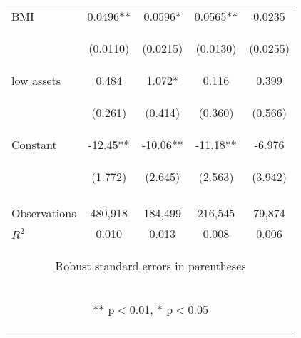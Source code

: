 \documentclass[]{article}
\begin{document}
\begin{center}
\begin{tabular}{lcccc}
BMI & 0.0496** & 0.0596* & 0.0565** & 0.0235 \\
\vspace{4pt} & \begin{footnotesize}(0.0110)\end{footnotesize} & \begin{footnotesize}(0.0215)\end{footnotesize} & \begin{footnotesize}(0.0130)\end{footnotesize} & \begin{footnotesize}(0.0255)\end{footnotesize} \\
low assets & 0.484 & 1.072* & 0.116 & 0.399 \\
\vspace{4pt} & \begin{footnotesize}(0.261)\end{footnotesize} & \begin{footnotesize}(0.414)\end{footnotesize} & \begin{footnotesize}(0.360)\end{footnotesize} & \begin{footnotesize}(0.566)\end{footnotesize} \\
Constant & -12.45** & -10.06** & -11.18** & -6.976 \\
 & \begin{footnotesize}(1.772)\end{footnotesize} & \begin{footnotesize}(2.645)\end{footnotesize} & \begin{footnotesize}(2.563)\end{footnotesize} & \begin{footnotesize}(3.942)\end{footnotesize} \\
\vspace{4pt} & \begin{footnotesize}\end{footnotesize} & \begin{footnotesize}\end{footnotesize} & \begin{footnotesize}\end{footnotesize} & \begin{footnotesize}\end{footnotesize} \\
Observations & 480,918 & 184,499 & 216,545 & 79,874 \\
 $R^2$ & 0.010 & 0.013 & 0.008 & 0.006 \\ \hline
\multicolumn{5}{c}{\begin{footnotesize} Robust standard errors in parentheses\end{footnotesize}} \\
\multicolumn{5}{c}{\begin{footnotesize} ** p$<$0.01, * p$<$0.05\end{footnotesize}} \\
\end{tabular}
\end{center}
\end{document}
